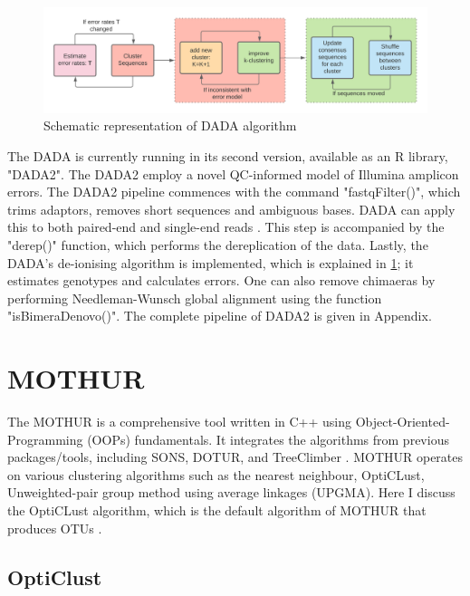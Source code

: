 \begin{figure}
  \centering
  \includegraphics[width=15cm]{../figures/Figure4.png}
  \caption{Schematic representation of DADA algorithm}
  \label{fig:figure4}
\end{figure}

The DADA is currently running in its second version, available as an R library, "DADA2". The DADA2 employ a novel QC-informed model of Illumina amplicon errors. The DADA2 pipeline commences with the command "fastqFilter()", which trims adaptors, removes short sequences and ambiguous bases. DADA can apply this to both paired-end and single-end reads \cite{ref17}. This step is accompanied by the "derep()" function, which performs the dereplication of the data. Lastly, the DADA's de-ionising algorithm is implemented, which is explained in  \ref{fig:figure4}; it estimates genotypes and calculates errors. One can also remove chimaeras by performing Needleman-Wunsch global alignment using the function "isBimeraDenovo()". The complete pipeline of DADA2 is given in Appendix.

\section{MOTHUR}
The MOTHUR is a comprehensive tool written in C++ using Object-Oriented-Programming (OOPs) fundamentals. It integrates the algorithms from previous packages/tools, including SONS, DOTUR, and TreeClimber \cite{ref18}. MOTHUR operates on various clustering algorithms such as the nearest neighbour, OptiCLust, Unweighted-pair group method using average linkages (UPGMA). Here I discuss the OptiCLust algorithm, which is the default algorithm of MOTHUR that produces OTUs \cite{ref18}.

\subsection*{OptiClust}

